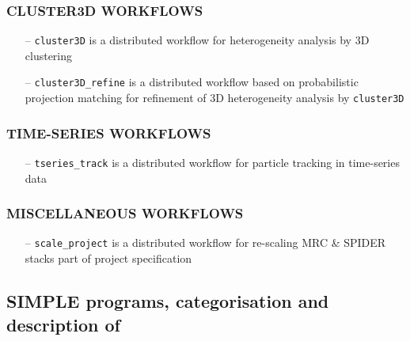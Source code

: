\documentclass[a4paper,11pt]{article}
\newcommand{\prgname}[1]{\textcolor{NavyBlue}{\texttt{#1}}}
\begin{document}
\subsubsection{CLUSTER3D WORKFLOWS}
\begin{itemize}
\item[--] \prgname{cluster3D} is a distributed workflow for heterogeneity analysis by 3D clustering
\item[--] \prgname{cluster3D\_refine} is a distributed workflow based on probabilistic projection matching for refinement of 3D heterogeneity analysis by \prgname{cluster3D}
\end{itemize}

\subsubsection{TIME-SERIES WORKFLOWS}
\begin{itemize}
\item[--] \prgname{tseries\_track} is a distributed workflow for particle tracking in time-series data
\end{itemize}

\subsubsection{MISCELLANEOUS WORKFLOWS}
\begin{itemize}
\item[--] \prgname{scale\_project} is a distributed workflow for re-scaling MRC \& SPIDER stacks part of project specification
\end{itemize}

\subsection{SIMPLE programs, categorisation and description of }
\end{document}
